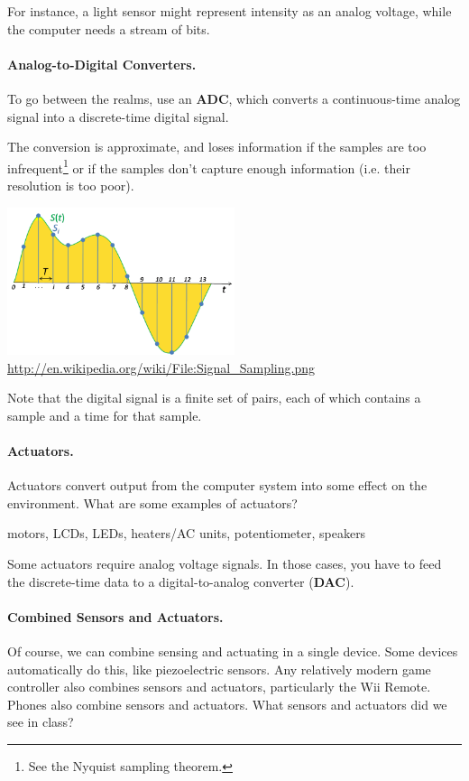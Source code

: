 For instance, a light sensor might represent intensity as an
analog voltage, while the computer needs a stream of bits.

\paragraph{Analog-to-Digital Converters.} To go between the realms,
use an {\bf ADC}, which converts a continuous-time analog signal into a
discrete-time digital signal.

The conversion is approximate, and loses information if the samples are
too infrequent\footnote{See the Nyquist sampling theorem.} or if the
samples don't capture enough information (i.e. their resolution is too poor).

\begin{center}
\includegraphics[width=0.5\textwidth]{images/sampling.png}
\hfill \url{http://en.wikipedia.org/wiki/File:Signal_Sampling.png}
\end{center}

Note that the digital signal is a finite set of pairs, each of which
contains a sample and a time for that sample.

\paragraph{Actuators.} Actuators convert output from the computer
system into some effect on the environment.  What are some
  examples of actuators?

motors, LCDs, LEDs, heaters/AC units, potentiometer, speakers

Some actuators require analog voltage signals. In those cases, you
have to feed the discrete-time data to a digital-to-analog converter
({\bf DAC}).

\paragraph{Combined Sensors and Actuators.} Of course, we can combine
sensing and actuating in a single device. Some devices automatically
do this, like piezoelectric sensors. Any relatively modern game
controller also combines sensors and actuators, particularly the Wii
Remote. Phones also combine sensors and actuators.
What sensors and actuators did we see in class?

